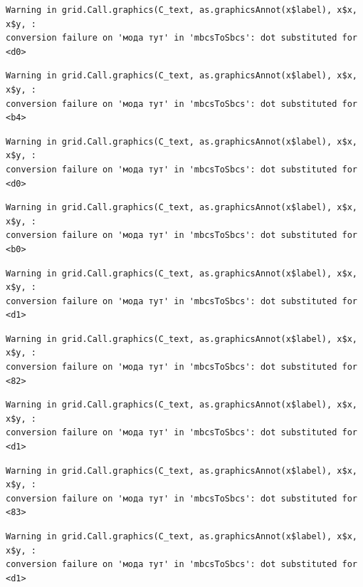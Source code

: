 \documentclass[
  letterpaper,
]{scrbook}
\theoremstyle{definition}
\theoremstyle{remark}
\begin{document}
\begin{verbatim}
Warning in grid.Call.graphics(C_text, as.graphicsAnnot(x$label), x$x, x$y, :
conversion failure on 'мода тут' in 'mbcsToSbcs': dot substituted for <d0>
\end{verbatim}

\begin{verbatim}
Warning in grid.Call.graphics(C_text, as.graphicsAnnot(x$label), x$x, x$y, :
conversion failure on 'мода тут' in 'mbcsToSbcs': dot substituted for <b4>
\end{verbatim}

\begin{verbatim}
Warning in grid.Call.graphics(C_text, as.graphicsAnnot(x$label), x$x, x$y, :
conversion failure on 'мода тут' in 'mbcsToSbcs': dot substituted for <d0>
\end{verbatim}

\begin{verbatim}
Warning in grid.Call.graphics(C_text, as.graphicsAnnot(x$label), x$x, x$y, :
conversion failure on 'мода тут' in 'mbcsToSbcs': dot substituted for <b0>
\end{verbatim}

\begin{verbatim}
Warning in grid.Call.graphics(C_text, as.graphicsAnnot(x$label), x$x, x$y, :
conversion failure on 'мода тут' in 'mbcsToSbcs': dot substituted for <d1>
\end{verbatim}

\begin{verbatim}
Warning in grid.Call.graphics(C_text, as.graphicsAnnot(x$label), x$x, x$y, :
conversion failure on 'мода тут' in 'mbcsToSbcs': dot substituted for <82>
\end{verbatim}

\begin{verbatim}
Warning in grid.Call.graphics(C_text, as.graphicsAnnot(x$label), x$x, x$y, :
conversion failure on 'мода тут' in 'mbcsToSbcs': dot substituted for <d1>
\end{verbatim}

\begin{verbatim}
Warning in grid.Call.graphics(C_text, as.graphicsAnnot(x$label), x$x, x$y, :
conversion failure on 'мода тут' in 'mbcsToSbcs': dot substituted for <83>
\end{verbatim}

\begin{verbatim}
Warning in grid.Call.graphics(C_text, as.graphicsAnnot(x$label), x$x, x$y, :
conversion failure on 'мода тут' in 'mbcsToSbcs': dot substituted for <d1>
\end{verbatim}
\end{document}

